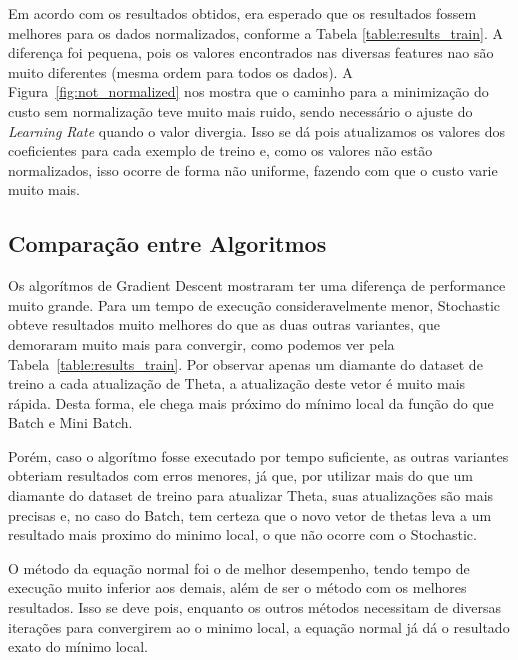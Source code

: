 \documentclass[conference]{IEEEtran}
\begin{document}
Em acordo com os resultados obtidos, era esperado que os resultados fossem melhores para os dados normalizados, conforme a Tabela \ref{table:results_train}. A diferença foi pequena, pois os valores encontrados nas diversas features nao são muito diferentes (mesma ordem para todos os dados). A Figura~\ref{fig:not_normalized} nos mostra que o caminho para a minimização do custo sem normalização teve muito mais ruido, sendo necessário o ajuste do \textit{Learning Rate} quando o valor divergia. Isso se dá pois atualizamos os valores dos coeficientes para cada exemplo de treino e, como os valores não estão normalizados, isso ocorre de forma não uniforme, fazendo com que o custo varie muito mais.

\subsection{Comparação entre Algoritmos}

Os algorítmos de Gradient Descent mostraram ter uma diferença de performance muito grande. Para um tempo de execução consideravelmente menor, Stochastic obteve resultados muito melhores do que as duas outras variantes, que demoraram muito mais para convergir, como podemos ver pela Tabela~\ref{table:results_train}. Por observar apenas um diamante do dataset de treino a cada atualização de Theta, a atualização deste vetor é muito mais rápida. Desta forma, ele chega mais próximo do mínimo local da função do que Batch e Mini Batch.

Porém, caso o algorítmo fosse executado por tempo suficiente, as outras variantes obteriam resultados com erros menores, já que, por utilizar mais do que um diamante do dataset de treino para atualizar Theta, suas atualizações são mais precisas e, no caso do Batch, tem certeza que o novo vetor de thetas leva a um resultado mais proximo do minimo local, o que não ocorre com o Stochastic.

O método da equação normal foi o de melhor desempenho, tendo tempo de execução muito inferior aos demais, além de ser o método com os melhores resultados. Isso se deve pois, enquanto os outros métodos necessitam de diversas iterações para convergirem ao o minimo local, a equação normal já dá o resultado exato do mínimo local.
\end{document}
